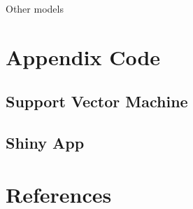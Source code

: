 \documentclass[10pt,letterpaper]{article}
\begin{document}
Other models

\section{Appendix Code}\label{appendix-code}

\subsection{Support Vector Machine}\label{support-vector-machine}

\subsection{Shiny App}\label{shiny-app}

\section*{References}\label{references}

\nolinenumbers
\end{document}
